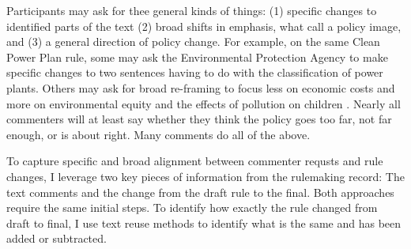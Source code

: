 
Participants may ask for thee general kinds of things: (1) specific changes to identified parts of the text (2) broad shifts in emphasis, what \citet{Jones2005} call a policy image, and (3) a general direction of policy change. For example, on the same Clean Power Plan rule, some may ask the Environmental Protection Agency to make specific changes to two sentences having to do with the classification of power plants. %
Others may ask for broad re-framing to focus less on economic costs and more on environmental equity and the effects of pollution on children \citep{Rinfret2011}.
Nearly all commenters will at least say whether they think the policy goes too far, not far enough, or is about right. Many comments do all of the above. 

To capture specific and broad alignment between commenter requsts and rule changes, I leverage two key pieces of information from the rulemaking record: The text comments and the change from the draft rule to the final. %
Both approaches require the same initial steps. To identify how exactly the rule changed from draft to final, I use text reuse methods to identify what is the same and has been added or subtracted. 





